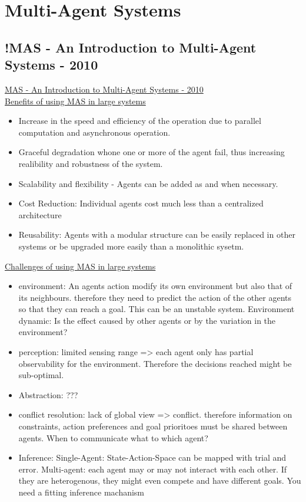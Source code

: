 \section{Multi-Agent Systems}
\subsection{!MAS - An Introduction to Multi-Agent Systems - 2010}
\href{https://link.springer.com/chapter/10.1007/978-3-642-14435-6_1}{MAS - An Introduction to Multi-Agent Systems - 2010}
\\
\underline{Benefits of using MAS in large systems}
\begin{itemize}[noitemsep,nolistsep]
	\item Increase in the speed and efficiency of the operation due to parallel computation and asynchronous operation.
	\item Graceful degradation whone one or more of the agent fail, thus increasing realibility and robustness of the system.
	\item Scalability and flexibility - Agents can be added as and when necessary.
	\item Cost Reduction: Individual agents cost much less than a centralized architecture
	\item Reusability: Agents with a modular structure can be easily replaced in other systems or be upgraded more easily than a monolithic sysetm.
\end{itemize}
\underline{Challenges of using MAS in large systems}
\begin{itemize}[noitemsep,nolistsep]
	\item environment: An agents action modify its own environment but also that of its neighbours. therefore they need to predict the action of the other agents so that they can reach a goal. This can be an unstable system. Environment dynamic: Is the effect caused by other agents or by the variation in the environment?
	\item perception: limited sensing range => each agent only has partial observability for the environment. Therefore the decisions reached might be sub-optimal.
	\item Abstraction: ???
	\item conflict resolution: lack of global view => conflict. therefore information on constraints, action preferences and goal prioritoes must be shared between agents. When to communicate what to which agent?
	\item Inference: Single-Agent: State-Action-Space can be mapped with trial and error. Multi-agent: each agent may or may not interact with each other. If they are heterogenous, they might even compete and have different goals. You need a fitting inference machanism
\end{itemize}
